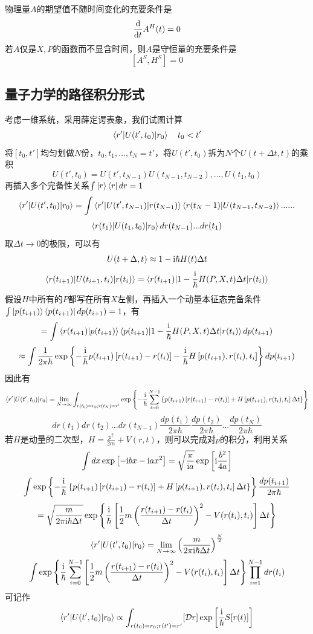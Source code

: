物理量$A$的期望值不随时间变化的充要条件是
$$\frac{\mathrm{d}}{\mathrm{d} t}A^H(t)=0$$
若$A$仅是$X,P$的函数而不显含时间，则$A$是守恒量的充要条件是
$$[A^S,H^S]=0$$

\subsection{量子力学的路径积分形式}
考虑一维系统，采用薛定谔表象，我们试图计算
$$\braket{r'|U(t',t_0)|r_0}\quad t_0<t'$$
将$[t_0,t']$均匀划做$N$份，$t_0,t_1,...,t_N=t'$，将$U(t',t_0)$拆为$N$个$U(t+\Delta t,t)$的乘积
$$U(t',t_0)=U(t',t_{N-1})U(t_{N-1},t_{N-2}),...,U(t_1,t_0)$$
再插入多个完备性关系$\int\ket{r}\bra{r}dr=1$
$$\braket{r'|U(t',t_0)|r_0}=\int\braket{r'|U(t',t_{N-1})|r(t_{N-1})}\braket{r(t_N-1)|U(t_{N-1},t_{N-2})}......$$
$$\braket{r(t_1)|U(t_1,t_0)|r_0}dr(t_{N-1})...dr(t_1)$$
取$\Delta t\to 0$的极限，可以有
$$U(t+\Delta,t)\approx 1-\mathrm{i}\hbar H(t)\Delta t$$
$$\braket{r(t_{i+1})|U(t_{i+1},t_i)|r(t_i)}=\braket{r(t_{i+1})|1-\frac{\mathrm{i}}{\hbar} H(P,X,t)\Delta t|r(t_i)}$$
假设$H$中所有的$P$都写在所有$X$左侧，再插入一个动量本征态完备条件$\int\ket{p(t_{i+1})}\bra{p(t_{i+1})}dp(t_{i+1})=1$，有
$$=\int\braket{r(t_{i+1})|p(t_{i+1})}\braket{p(t_{i+1})|1-\frac{\mathrm{i}}{\hbar} H(P,X,t)\Delta t|r(t_i)}dp(t_{i+1})$$
$$\approx \int\frac{1}{2\pi\hbar}\exp\left\{-\frac{\mathrm{i}}{\hbar} p(t_{i+1})\left[r(t_{i+1})-r(t_i)\right]-\frac{\mathrm{i}}{\hbar}H\left[p(t_{i+1}),r(t_i),t_i\right]\right\}dp(t_{i+1})$$
因此有
$$\braket{r'|U(t',t_0)|r_0}=\lim_{N\to\infty}\int_{r(t_0)=r_0;r(t_N)=r'}\exp\left\{-\frac{\mathrm{i}}{\hbar}\sum_{i=0}^{N-1}\left\{p(t_{i+1})\left[r(t_{i+1})-r(t_i)\right]+H\left[p(t_{i+1}),r(t_i),t_i\right]\Delta t\right\}\right\}$$
$$dr(t_1)dr(t_2)...dr(t_{N-1})\frac{dp(t_1)}{2\pi\hbar}\frac{dp(t_2)}{2\pi\hbar}...\frac{dp(t_{N})}{2\pi\hbar}$$
若$H$是动量的二次型，$H=\frac{p^2}{2m}+V(r,t)$，则可以完成对$p$的积分，利用关系
$$\int dx \exp\left[-\mathrm{i} bx-\mathrm{i} ax^2\right]=\sqrt{\frac{\pi}{\mathrm{i} a}}\exp\left[\mathrm{i}\frac{b^2}{4a}\right]$$
$$\int \exp\left\{-\frac{\mathrm{i}}{\hbar}\left\{p(t_{i+1})\left[r(t_{i+1})-r(t_i)\right]+H\left[p(t_{i+1}),r(t_i),t_i\right]\Delta t\right\}\right\}\frac{dp(t_{i+1})}{2\pi\hbar}$$
$$=\sqrt{\frac{m}{2\pi \mathrm{i}\hbar\Delta t}}\exp\left\{\frac{\mathrm{i}}{\hbar}\left[\frac{1}{2}m\left(\frac{r(t_{i+1})-r(t_i)}{\Delta t}\right)^2-V(r(t_i),t_i)\right]\Delta t\right\}$$
$$\braket{r'|U(t',t_0)|r_0}=\lim_{N\to\infty}\left(\frac{m}{2\pi \mathrm{i}\hbar\Delta t}\right)^{\frac{N}{2}}$$
$$\int \exp\left\{\frac{\mathrm{i}}{\hbar}\sum_{i=0}^{N-1}\left[\frac{1}{2}m\left(\frac{r(t_{i+1})-r(t_i)}{\Delta t}\right)^2-V(r(t_i),t_i)\right]\Delta t\right\}\prod_{i=1}^{N-1}dr(t_i)$$
可记作
$$\braket{r'|U(t',t_0)|r_0}\propto \int_{r(t_0)=r_0;r(t')=r'}[\mathcal{D}r]\exp\left[\frac{\mathrm{i}}{\hbar} S[r(t)]\right]$$
